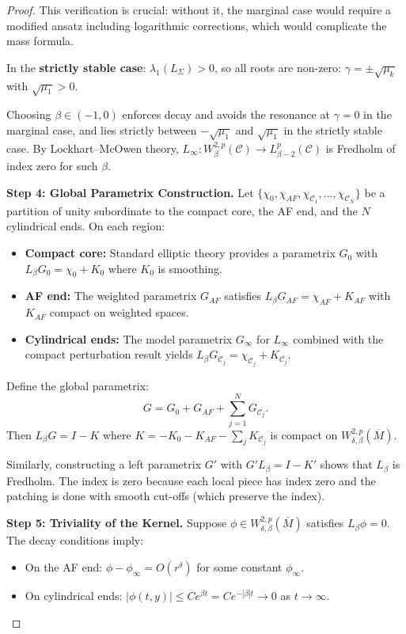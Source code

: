 \begin{proof}
This verification is crucial: without it, the marginal case would require a modified ansatz including logarithmic corrections, which would complicate the mass formula.

In the \textbf{strictly stable case}: $\lambda_1(L_\Sigma) > 0$, so all roots are non-zero: $\gamma = \pm\sqrt{\mu_k}$ with $\sqrt{\mu_1} > 0$.

Choosing $\beta \in (-1, 0)$ enforces decay and avoids the resonance at $\gamma=0$ in the marginal case, and lies strictly between $-\sqrt{\mu_1}$ and $\sqrt{\mu_1}$ in the strictly stable case. By Lockhart--McOwen theory, $L_\infty : W^{2,p}_\beta(\mathcal{C}) \to L^p_{\beta-2}(\mathcal{C})$ is Fredholm of index zero for such $\beta$.

\medskip\noindent
\textbf{Step 4: Global Parametrix Construction.}
Let $\{\chi_0, \chi_{AF}, \chi_{\mathcal{C}_1}, \ldots, \chi_{\mathcal{C}_N}\}$ be a partition of unity subordinate to the compact core, the AF end, and the $N$ cylindrical ends. On each region:
\begin{itemize}
    \item \textbf{Compact core:} Standard elliptic theory provides a parametrix $G_0$ with $L_\beta G_0 = \chi_0 + K_0$ where $K_0$ is smoothing.
    \item \textbf{AF end:} The weighted parametrix $G_{AF}$ satisfies $L_\beta G_{AF} = \chi_{AF} + K_{AF}$ with $K_{AF}$ compact on weighted spaces.
    \item \textbf{Cylindrical ends:} The model parametrix $G_\infty$ for $L_\infty$ combined with the compact perturbation result yields $L_\beta G_{\mathcal{C}_j} = \chi_{\mathcal{C}_j} + K_{\mathcal{C}_j}$.
\end{itemize}

Define the global parametrix:
\[
    G = G_0 + G_{AF} + \sum_{j=1}^N G_{\mathcal{C}_j}.
\]
Then $L_\beta G = I - K$ where $K = -K_0 - K_{AF} - \sum_j K_{\mathcal{C}_j}$ is compact on $W^{2,p}_{\delta,\beta}(\overline{M})$.

Similarly, constructing a left parametrix $G'$ with $G' L_\beta = I - K'$ shows that $L_\beta$ is Fredholm. The index is zero because each local piece has index zero and the patching is done with smooth cut-offs (which preserve the index).

\medskip\noindent
\textbf{Step 5: Triviality of the Kernel.}
Suppose $\phi \in W^{2,p}_{\delta,\beta}(\overline{M})$ satisfies $L_\beta \phi = 0$. The decay conditions imply:
\begin{itemize}
    \item On the AF end: $\phi - \phi_\infty = O(r^{\delta})$ for some constant $\phi_\infty$.
    \item On cylindrical ends: $|\phi(t,y)| \le C e^{\beta t} = C e^{-|\beta| t} \to 0$ as $t \to \infty$.
\end{itemize}


\end{proof}
